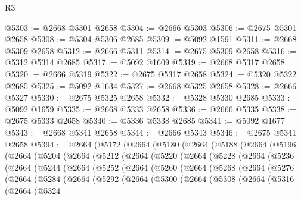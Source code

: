 \begin{lexlean}{R3}
\begin{coremodule}
@5303 := @2668 @5301 @2658
@5304 := @2666 @5303
@5306 := @2675 @5301 @2658
@5308 := @5304 @5306 @2685
@5309 := @5092 @1591
@5311 := @2668 @5309 @2658
@5312 := @2666 @5311
@5314 := @2675 @5309 @2658
@5316 := @5312 @5314 @2685
@5317 := @5092 @1609
@5319 := @2668 @5317 @2658
@5320 := @2666 @5319
@5322 := @2675 @5317 @2658
@5324 := @5320 @5322 @2685
@5325 := @5092 @1634
@5327 := @2668 @5325 @2658
@5328 := @2666 @5327
@5330 := @2675 @5325 @2658
@5332 := @5328 @5330 @2685
@5333 := @5092 @1659
@5335 := @2668 @5333 @2658
@5336 := @2666 @5335
@5338 := @2675 @5333 @2658
@5340 := @5336 @5338 @2685
@5341 := @5092 @1677
@5343 := @2668 @5341 @2658
@5344 := @2666 @5343
@5346 := @2675 @5341 @2658
@5394 := @2664
    (@5172
      (@2664
        (@5180
          (@2664
            (@5188
              (@2664
                (@5196
                  (@2664
                    (@5204
                      (@2664
                        (@5212
                          (@2664
                            (@5220
                              (@2664
                                (@5228
                                  (@2664
                                    (@5236
                                      (@2664
                                        (@5244
                                          (@2664
                                            (@5252
                                              (@2664
                                                (@5260
                                                  (@2664
                                                    (@5268
                                                      (@2664
                                                        (@5276
                                                          (@2664
                                                            (@5284
                                                              (@2664
                                                                (@5292
                                                                  (@2664
                                                                    (@5300
                                                                      (@2664
                                                                        (@5308
                                                                          (@2664
                                                                            (@5316
                                                                              (@2664
                                                                                (@5324

\end{coremodule}
\end{lexlean}
